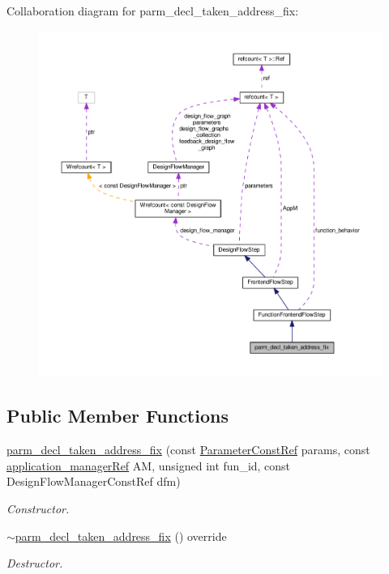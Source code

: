Collaboration diagram for parm\+\_\+decl\+\_\+taken\+\_\+address\+\_\+fix\+:
\nopagebreak
\begin{figure}[H]
\begin{center}
\leavevmode
\includegraphics[width=350pt]{d8/dcd/classparm__decl__taken__address__fix__coll__graph}
\end{center}
\end{figure}
\subsection*{Public Member Functions}
\begin{DoxyCompactItemize}
\item 
\hyperlink{classparm__decl__taken__address__fix_aa1e7ca2ebe935f87fc9f2019544cce88}{parm\+\_\+decl\+\_\+taken\+\_\+address\+\_\+fix} (const \hyperlink{Parameter_8hpp_a37841774a6fcb479b597fdf8955eb4ea}{Parameter\+Const\+Ref} params, const \hyperlink{application__manager_8hpp_a04ccad4e5ee401e8934306672082c180}{application\+\_\+manager\+Ref} AM, unsigned int fun\+\_\+id, const Design\+Flow\+Manager\+Const\+Ref dfm)
\begin{DoxyCompactList}\small\item\em Constructor. \end{DoxyCompactList}\item 
\hyperlink{classparm__decl__taken__address__fix_a3a432417ede404ca05b53522759ca99a}{$\sim$parm\+\_\+decl\+\_\+taken\+\_\+address\+\_\+fix} () override
\begin{DoxyCompactList}\small\item\em Destructor. \end{DoxyCompactList}\end{DoxyCompactItemize}
